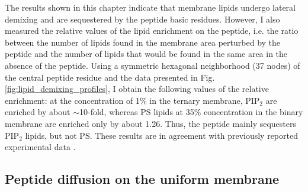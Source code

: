 The results shown in this chapter indicate that membrane lipids undergo lateral demixing and are sequestered by the peptide basic residues. However, I also measured the relative values of the lipid enrichment on the peptide, i.e. the ratio between the number of lipids found in the membrane area perturbed by the peptide and the number of lipids that would be found in the same area in the absence of the peptide. Using a symmetric hexagonal neighborhood (37 nodes) of the central peptide residue and the data presented in Fig. \ref{fig:lipid_demixing_profiles}, I obtain the following values of the relative enrichment: at the concentration of 1\% in the ternary membrane, PIP$_2$ are enriched by about $\sim$10-fold, whereas PS lipids at 35\% concentration in the binary membrane are enriched only by about 1.26. Thus, the peptide mainly sequesters PIP$_2$ lipids, but not PS. These results are in agreement with previously reported experimental data \cite{Wang2002,Gambhir2004,Golebiewska2006}.

\subsection{Peptide diffusion on the uniform membrane}

